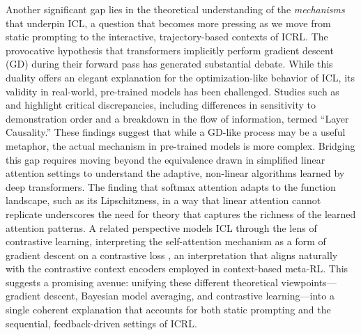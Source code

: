 \documentclass[11pt]{article}
\begin{document}
Another significant gap lies in the theoretical understanding of the \emph{mechanisms} that underpin ICL, a question that becomes more pressing as we move from static prompting to the interactive, trajectory-based contexts of ICRL. The provocative hypothesis that transformers implicitly perform gradient descent (GD) during their forward pass \cite{ref25} has generated substantial debate. While this duality offers an elegant explanation for the optimization-like behavior of ICL, its validity in real-world, pre-trained models has been challenged. Studies such as \cite{ref26} and \cite{ref10} highlight critical discrepancies, including differences in sensitivity to demonstration order and a breakdown in the flow of information, termed ``Layer Causality.'' These findings suggest that while a GD-like process may be a useful metaphor, the actual mechanism in pre-trained models is more complex. Bridging this gap requires moving beyond the equivalence drawn in simplified linear attention settings to understand the adaptive, non-linear algorithms learned by deep transformers. The finding that softmax attention adapts to the function landscape, such as its Lipschitzness, in a way that linear attention cannot replicate \cite{ref65} underscores the need for theory that captures the richness of the learned attention patterns. A related perspective models ICL through the lens of contrastive learning, interpreting the self-attention mechanism as a form of gradient descent on a contrastive loss \cite{ref42}, an interpretation that aligns naturally with the contrastive context encoders employed in context-based meta-RL. This suggests a promising avenue: unifying these different theoretical viewpoints---gradient descent, Bayesian model averaging, and contrastive learning---into a single coherent explanation that accounts for both static prompting and the sequential, feedback-driven settings of ICRL.
\end{document}
